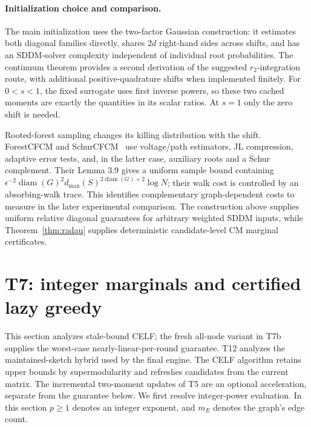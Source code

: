 \documentclass[11pt]{article}
\begin{document}
\paragraph{Initialization choice and comparison.}
The main initialization uses the two-factor Gaussian construction:
it estimates both diagonal families directly, shares $2d$ right-hand
sides across shifts, and has an SDDM-solver complexity independent of
individual root probabilities. The continuum theorem provides a
second derivation of the suggested $r_2$-integration route, with
additional positive-quadrature shifts when implemented finitely.
For $0<s<1$, the fixed surrogate uses first inverse powers, so these
two cached moments are exactly the quantities in its scalar ratios.
At $s=1$ only the zero shift is needed.

Rooted-forest sampling changes its killing distribution with the
shift. ForestCFCM and SchurCFCM~\cite{xia2025} use voltage/path
estimators, JL compression, adaptive error tests, and, in the latter
case, auxiliary roots and a Schur complement. Their Lemma 3.9 gives
a uniform sample bound containing
$\epsilon^{-2}\operatorname{diam}(G)^2
 d_{\max}(S)^{2\operatorname{diam}(G)+2}\log N$;
their walk cost is controlled by an absorbing-walk trace.
This identifies complementary graph-dependent costs to measure in
the later experimental comparison. The construction above supplies
uniform relative diagonal guarantees for arbitrary weighted SDDM
inputs, while Theorem~\ref{thm:radau} supplies deterministic
candidate-level CM marginal certificates.

\section{T7: integer marginals and certified lazy greedy}
This section analyzes stale-bound CELF; the fresh all-node variant
in T7b supplies the worst-case nearly-linear-per-round guarantee.
T12 analyzes the maintained-sketch hybrid used by the final engine.
The CELF algorithm retains upper bounds by supermodularity and
refreshes candidates from the current matrix. The incremental
two-moment updates of T5 are an optional acceleration, separate
from the guarantee below. We first resolve integer-power evaluation.
In this section $p\geq1$ denotes an integer exponent, and $m_E$
denotes the graph's edge count.
\end{document}
